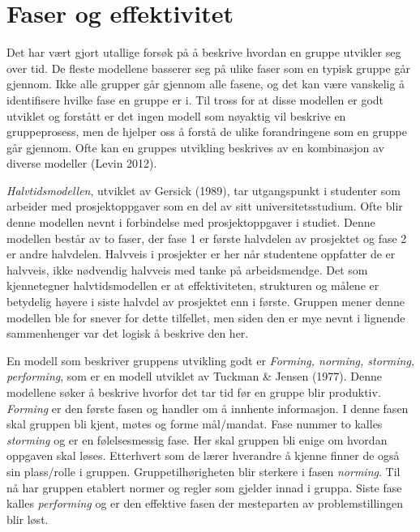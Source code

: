 \section{Faser og effektivitet}
Det har vært gjort utallige forsøk på å beskrive hvordan en gruppe utvikler seg over tid. 
De fleste modellene basserer seg på ulike faser som en typisk gruppe går gjennom. 
Ikke alle grupper går gjennom alle fasene, og det kan være vanskelig å identifisere hvilke fase en gruppe er i.
Til tross for at disse modellen er godt utviklet og forstått er det ingen modell som nøyaktig vil beskrive en gruppeprosess, men de hjelper oss å forstå de ulike forandringene som en gruppe går gjennom. 
Ofte kan en gruppes utvikling beskrives av en kombinasjon av diverse modeller (Levin 2012). 
\vspace{\secspace}

\textit{Halvtidsmodellen}, utviklet av Gersick (1989), tar utgangspunkt i studenter som arbeider med prosjektoppgaver som en del av sitt universitetsstudium.
Ofte blir denne modellen nevnt i forbindelse med prosjektoppgaver i studiet. 
Denne modellen består av to faser, der fase 1 er første halvdelen av prosjektet og fase 2 er andre halvdelen. 
Halvveis i prosjekter er her når studentene oppfatter de er halvveis, ikke nødvendig halvveis med tanke på arbeidsmendge. 
Det som kjennetegner halvtidsmodellen er at effektiviteten, strukturen og målene er betydelig høyere i siste halvdel av prosjektet enn i første.
Gruppen mener denne modellen ble for snever for dette tilfellet, men siden den er mye nevnt i lignende sammenhenger var det logisk å beskrive den her. 
\vspace{\secspace}

En modell som beskriver gruppens utvikling godt er \textit{Forming, norming, storming, performing}, som er en modell utviklet av Tuckman \& Jensen (1977). 
Denne modellene søker å beskrive hvorfor det tar tid før en gruppe blir produktiv. 
\textit{Forming} er den første fasen og handler om å innhente informasjon. 
I denne fasen skal gruppen bli kjent, møtes og forme mål/mandat.
Fase nummer to kalles \textit{storming} og er en følelsesmessig fase. 
Her skal gruppen bli enige om hvordan oppgaven skal løses. 
Etterhvert som de lærer hverandre å kjenne finner de også sin plass/rolle i gruppen. 
Gruppetilhørigheten blir sterkere i fasen \textit{norming}. 
Til nå har gruppen etablert normer og regler som gjelder innad i gruppa. 
Siste fase kalles \textit{performing} og er den effektive fasen der mesteparten av problemstillingen blir løst. 
\vspace{\secspace}

